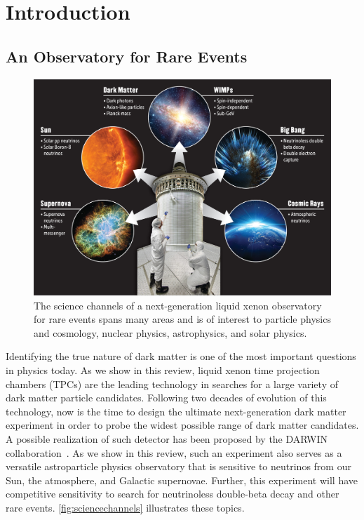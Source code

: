 \section{Introduction}\label{sec:introduction}

\subsection{An Observatory for Rare Events}

\begin{figure}[!htbp]
\begin{center}
\includegraphics[width=2\columnwidth]{fig_sciencechannels.jpg}
\caption{The science channels of a next-generation liquid xenon observatory for rare events spans many areas and is of interest to particle physics and cosmology, nuclear physics, astrophysics, and solar physics.}\label{fig:sciencechannels}
\end{center}
\end{figure}

Identifying the true nature of dark matter is one of the most important questions in physics today. As we show in this review, liquid xenon time projection chambers (TPCs) are the leading technology in searches for a large variety of dark matter particle candidates. Following two decades of evolution of this technology, now is the time to design the ultimate next-generation dark matter experiment in order to probe the widest possible range of dark matter candidates. A possible realization of such detector has been proposed by the DARWIN collaboration~\cite{Aalbers:2016jon}. As we show in this review, such an experiment also serves as a versatile astroparticle physics observatory that is sensitive to neutrinos from our Sun, the atmosphere, and Galactic supernovae. Further, this experiment will have competitive sensitivity to search for neutrinoless double-beta decay and other rare events. \autoref{fig:sciencechannels} illustrates these topics.

